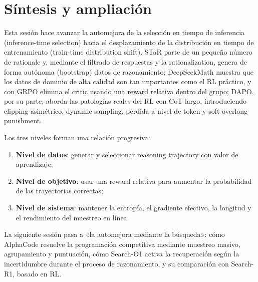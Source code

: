 \section{Síntesis y ampliación}

Esta sesión hace avanzar la automejora de la selección en tiempo de inferencia (inference-time selection) hacia el desplazamiento de la distribución en tiempo de entrenamiento (train-time distribution shift). STaR parte de un pequeño número de rationale y, mediante el filtrado de respuestas y la rationalization, genera de forma autónoma (bootstrap) datos de razonamiento; DeepSeekMath muestra que los datos de dominio de alta calidad son tan importantes como el RL práctico, y con GRPO elimina el critic usando una reward relativa dentro del grupo; DAPO, por su parte, aborda las patologías reales del RL con CoT largo, introduciendo clipping asimétrico, dynamic sampling, pérdida a nivel de token y soft overlong punishment.

Los tres niveles forman una relación progresiva:

\begin{enumerate}
    \item \textbf{Nivel de datos}: generar y seleccionar reasoning trajectory con valor de aprendizaje;
    \item \textbf{Nivel de objetivo}: usar una reward relativa para aumentar la probabilidad de las trayectorias correctas;
    \item \textbf{Nivel de sistema}: mantener la entropía, el gradiente efectivo, la longitud y el rendimiento del muestreo en línea.
\end{enumerate}

La siguiente sesión pasa a «la automejora mediante la búsqueda»: cómo AlphaCode resuelve la programación competitiva mediante muestreo masivo, agrupamiento y puntuación, cómo Search-O1 activa la recuperación según la incertidumbre durante el proceso de razonamiento, y su comparación con Search-R1, basado en RL.


